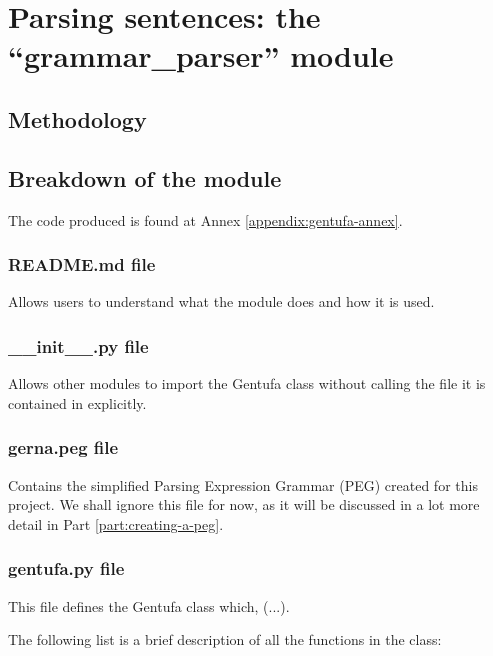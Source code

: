 \chapter{Parsing sentences: the ``grammar\_parser'' module}
\label{chap:parser}

\section{Methodology}


\section{Breakdown of the module}
\label{sec:parsing_lojban_sentences}

The code produced is found at Annex \ref{appendix:gentufa-annex}.

\subsection*{README.md file}

Allows users to understand what the module does and how it is used.

\subsection*{\_\_init\_\_.py file}

Allows other modules to import the Gentufa class without calling the file it is contained in explicitly.

\subsection*{gerna.peg file}

Contains the simplified Parsing Expression Grammar (PEG) created for this project.
We shall ignore this file for now, as it will be discussed in a lot more detail in Part \ref{part:creating-a-peg}.

\subsection*{gentufa.py file}

This file defines the Gentufa class which, (...).\newline

\newpage

The following list is a brief description of all the functions in the class:

